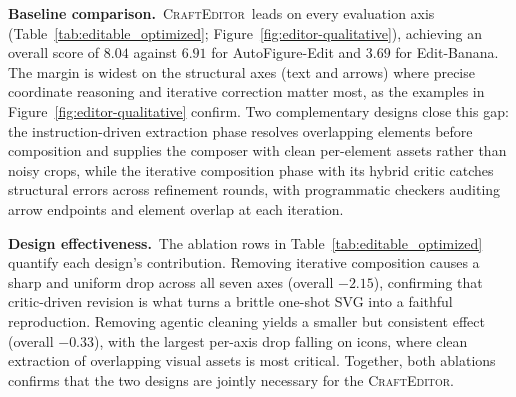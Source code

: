 \documentclass{article}
\newcommand{\Editor}{\textsc{CraftEditor}\xspace}
\begin{document}
\noindent\textbf{Baseline comparison.}\ \Editor\ leads on every evaluation axis (Table~\ref{tab:editable_optimized}; Figure~\ref{fig:editor-qualitative}), achieving an overall score of $8.04$ against $6.91$ for AutoFigure-Edit and $3.69$ for Edit-Banana. The margin is widest on the structural axes (text and arrows) where precise coordinate reasoning and iterative correction matter most, as the examples in Figure~\ref{fig:editor-qualitative} confirm. Two complementary designs close this gap: the instruction-driven extraction phase resolves overlapping elements before composition and supplies the composer with clean per-element assets rather than noisy crops, while the iterative composition phase with its hybrid critic catches structural errors across refinement rounds, with programmatic checkers auditing arrow endpoints and element overlap at each iteration.

\noindent\textbf{Design effectiveness.}\ The ablation rows in Table~\ref{tab:editable_optimized} quantify each design's contribution. Removing iterative composition causes a sharp and uniform drop across all seven axes (overall $-2.15$), confirming that critic-driven revision is what turns a brittle one-shot SVG into a faithful reproduction. Removing agentic cleaning yields a smaller but consistent effect (overall $-0.33$), with the largest per-axis drop falling on icons, where clean extraction of overlapping visual assets is most critical. Together, both ablations confirms that the two designs are jointly necessary for the \Editor.

\end{document}
